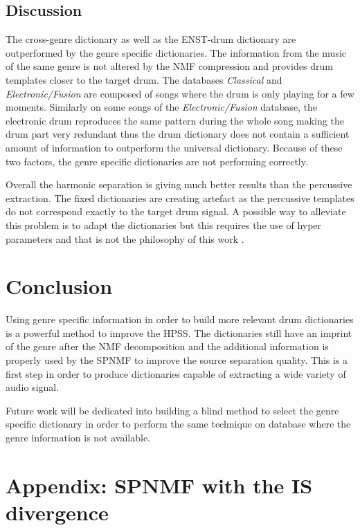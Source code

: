 \documentclass{article}
\begin{document}
\subsection{Discussion}

The cross-genre dictionary as well as the ENST-drum dictionary are outperformed by the genre specific dictionaries. The information from the music of the same genre is not altered by the NMF compression and provides drum templates closer to the target drum.  
The databases \emph{Classical} and \emph{Electronic/Fusion} are composed of songs where the drum is only playing for a few moments. Similarly on some songs of the \emph{Electronic/Fusion} database, the electronic drum reproduces the same pattern during the whole song making the drum part very redundant thus the drum dictionary does not contain a sufficient amount of information to outperform the universal dictionary. Because of these two factors, the genre specific dictionaries are not performing correctly.

Overall the harmonic separation is giving much better results than the percussive extraction. The fixed dictionaries are creating artefact as the percussive templates do not correspond exactly to the target drum signal. A possible way to alleviate this problem is to adapt the dictionaries but this requires the use of hyper parameters and that is not the philosophy of this work \cite{laroche2015structuredhidden}.



\section{Conclusion}\label{sec:conclusion}

Using genre specific information in order to build more relevant drum dictionaries is a powerful method to improve the HPSS. The dictionaries still have an imprint of the genre after the NMF decomposition and the additional information is properly used by the SPNMF to improve the source separation quality. This is a first step in order to produce dictionaries capable of extracting a wide variety of audio signal. 

Future work will be dedicated into building a blind method to select the genre specific dictionary in order to perform the same technique on database where the genre information is not available. 


\section{Appendix: SPNMF with the IS divergence}\label{ISdisteq}
 
\end{document}
